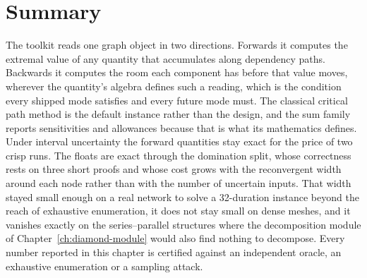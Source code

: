 \documentclass[12pt]{report}
\begin{document}
\section{Summary}
\label{sec:cpm-summary}

The toolkit reads one graph object in two directions. Forwards it computes
the extremal value of any quantity that accumulates along dependency paths.
Backwards it computes the room each component has before that value moves,
wherever the quantity's algebra defines such a reading, which is the
condition every shipped mode satisfies and every future mode must. The
classical critical path method is the default instance rather than the
design, and the sum family reports sensitivities and allowances because
that is what its mathematics defines. Under interval uncertainty the
forward quantities stay exact for the price of two crisp runs. The floats
are exact through the domination split, whose correctness rests on three
short proofs and whose cost grows with the reconvergent width around each
node rather than with the number of uncertain inputs. That width stayed
small enough on a real network to solve a 32-duration instance beyond the
reach of exhaustive enumeration, it does not stay small on dense meshes,
and it vanishes exactly on the series--parallel structures where the
decomposition module of Chapter~\ref{ch:diamond-module} would also find
nothing to decompose. Every number reported in this chapter is certified
against an independent oracle, an exhaustive enumeration or a sampling
attack.

\ifdefined\maindoc
\else
\printbibliography
\end{document}
